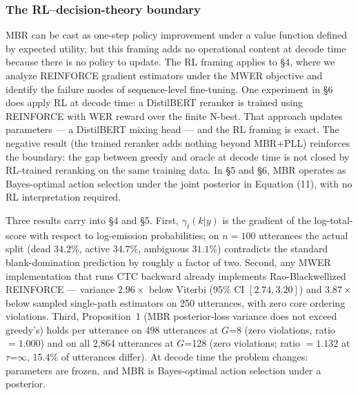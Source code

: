 \subsubsection{The RL–decision-theory boundary}

MBR can be cast as one-step policy improvement under a value function defined by expected utility, but this framing adds no operational content at decode time because there is no policy to update. The RL framing applies to §4, where we analyze REINFORCE gradient estimators under the MWER objective and identify the failure modes of sequence-level fine-tuning. One experiment in §6 does apply RL at decode time: a DistilBERT \cite{sanh2019distilbert} reranker is trained using REINFORCE with WER reward over the finite N-best. That approach updates parameters — a DistilBERT mixing head — and the RL framing is exact. The negative result (the trained reranker adds nothing beyond MBR+PLL) reinforces the boundary: the gap between greedy and oracle at decode time is not closed by RL-trained reranking on the same training data. In §5 and §6, MBR operates as Bayes-optimal action selection under the joint posterior in Equation (11), with no RL interpretation required.



Three results carry into §4 and §5. First, $\gamma_t(k|y)$ is the gradient of the log-total-score with respect to log-emission probabilities; on $n = 100$ utterances the actual split (dead $34.2\%$, active $34.7\%$, ambiguous $31.1\%$) contradicts the standard blank-domination prediction by roughly a factor of two. Second, any MWER implementation that runs CTC backward already implements Rao-Blackwellized REINFORCE — variance $2.96\times$ below Viterbi (95\% CI $[2.74, 3.20]$) and $3.87\times$ below sampled single-path estimators on 250 utterances, with zero core ordering violations. Third, Proposition~1 (MBR posterior-loss variance does not exceed greedy's) holds per utterance on 498 utterances at $G$=8 (zero violations, ratio $= 1.000$) and on all 2{,}864 utterances at $G$=128 (zero violations; ratio $= 1.132$ at $\tau$=$\infty$, 15.4\% of utterances differ). At decode time the problem changes: parameters are frozen, and MBR is Bayes-optimal action selection under a posterior.




